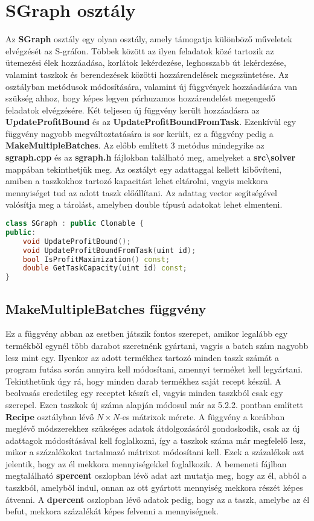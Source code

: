 \section{SGraph osztály}
Az \textbf{SGraph} osztály egy olyan osztály, amely támogatja különböző műveletek elvégzését az S-gráfon.
Többek között az ilyen feladatok közé tartozik az ütemezési élek hozzáadása, korlátok lekérdezése, leghosszabb út lekérdezése, valamint taszkok és berendezések közötti hozzárendelések megszüntetése.
Az osztályban metódusok módosítására, valamint új függvények hozzáadására van szükség ahhoz, hogy képes legyen párhuzamos hozzárendelést megengedő feladatok elvégzésére.
Két teljesen új függvény került hozzáadásra az \textbf{UpdateProfitBound} és az \textbf{UpdateProfitBoundFromTask}.
Ezenkívül egy függvény nagyobb megváltoztatására is sor került, ez a függvény pedig a \textbf{MakeMultipleBatches}.
Az előbb említett 3 metódus mindegyike az \textbf{sgraph.cpp} és az \textbf{sgraph.h} fájlokban található meg, amelyeket a \textbf{src\textbackslash solver} mappában tekinthetjük meg.
Az osztályt egy adattaggal kellett kibővíteni, amiben a taszkokhoz tartozó kapacitást lehet eltárolni, vagyis mekkora mennyiséget tud az adott taszk előállítani.
Az adattag vector segítségével valósítja meg a tárolást, amelyben double típusú adatokat lehet elmenteni.
\begin{lstlisting}[caption={SGraph osztály header fájljában lévő új függvények deklarációja},language=c++,numbers=none]
class SGraph : public Clonable {
public:
	void UpdateProfitBound();
	void UpdateProfitBoundFromTask(uint id);
	bool IsProfitMaximization() const;
	double GetTaskCapacity(uint id) const;	
}
\end{lstlisting}

\subsection{MakeMultipleBatches függvény}
Ez a függvény abban az esetben játszik fontos szerepet, amikor legalább egy termékből egynél több darabot szeretnénk gyártani, vagyis a batch szám nagyobb lesz mint egy.
Ilyenkor az adott termékhez tartozó minden taszk számát a program futása során annyira kell módosítani, amennyi terméket kell legyártani.
Tekinthetünk úgy rá, hogy minden darab termékhez saját recept készül.
A beolvasás eredetileg egy receptet készít el, vagyis minden taszkból csak egy szerepel.
Ezen taszkok új száma alapján módosul már az 5.2.2. pontban említett \textbf{Recipe} osztályban lévő $N\times N$-es mátrixok mérete.
A függvény a korábban meglévő módszerekhez szükséges adatok átdolgozásáról gondoskodik, csak az új adattagok módosításával kell foglalkozni, így a taszkok száma már megfelelő lesz, mikor a százalékokat tartalmazó mátrixot módosítani kell.
Ezek a százalékok azt jelentik, hogy az él mekkora mennyiségekkel foglalkozik.
A bemeneti fájlban megtalálható \textbf{s\textunderscore percent} oszlopban lévő adat azt mutatja meg, hogy az él, abból a taszkból, amelyből indul, onnan az ott gyártott mennyiség mekkora részét képes átvenni.
A \textbf{d\textunderscore percent} oszlopban lévő adatok pedig, hogy az a taszk, amelybe az él befut, mekkora százalékát képes felvenni a mennyiségnek. 

